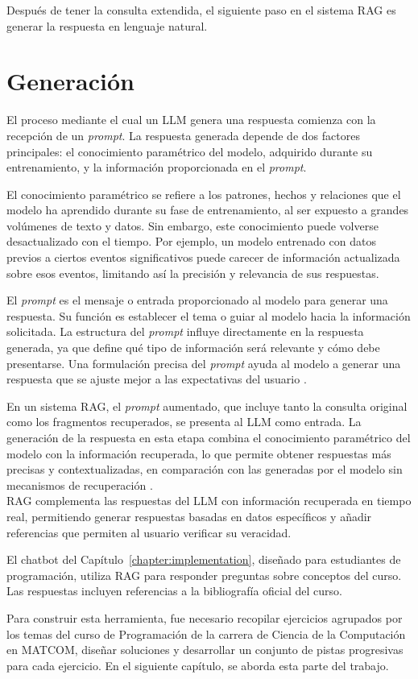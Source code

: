 Después de tener la consulta extendida, el siguiente paso en el sistema RAG es generar la respuesta en lenguaje natural.

\section{Generación}

El proceso mediante el cual un LLM genera una respuesta comienza con la recepción de un \textit{prompt}. La respuesta generada depende de dos factores principales: el conocimiento paramétrico del modelo, adquirido durante su entrenamiento, y la información proporcionada en el \textit{prompt}.

El conocimiento paramétrico se refiere a los patrones, hechos y relaciones que el modelo ha aprendido durante su fase de entrenamiento, al ser expuesto a grandes volúmenes de texto y datos. Sin embargo, este conocimiento puede volverse desactualizado con el tiempo. Por ejemplo, un modelo entrenado con datos previos a ciertos eventos significativos puede carecer de información actualizada sobre esos eventos, limitando así la precisión y relevancia de sus respuestas.

El \textit{prompt} es el mensaje o entrada proporcionado al modelo para generar una respuesta. Su función es establecer el tema o guiar al modelo hacia la información solicitada. La estructura del \textit{prompt} influye directamente en la respuesta generada, ya que define qué tipo de información será relevante y cómo debe presentarse. Una formulación precisa del \textit{prompt} ayuda al modelo a generar una respuesta que se ajuste mejor a las expectativas del usuario \cite{sahoo2024systematicsurveypromptengineering}.

En un sistema RAG, el \textit{prompt} aumentado, que incluye tanto la consulta original como los fragmentos recuperados, se presenta al LLM como entrada. La generación de la respuesta en esta etapa combina el conocimiento paramétrico del modelo con la información recuperada, lo que permite obtener respuestas más precisas y contextualizadas, en comparación con las generadas por el modelo sin mecanismos de recuperación \cite{gao2024retrievalaugmentedgenerationlargelanguage}.\\

RAG complementa las respuestas del LLM con información recuperada en tiempo real, permitiendo generar respuestas basadas en datos específicos y añadir referencias que permiten al usuario verificar su veracidad. 

El chatbot del Capítulo~\ref{chapter:implementation}, diseñado para estudiantes de programación, utiliza RAG para responder preguntas sobre conceptos del curso. Las respuestas incluyen referencias a la bibliografía oficial del curso.

Para construir esta herramienta, fue necesario recopilar ejercicios agrupados por los temas del curso de Programación de la carrera de Ciencia de la Computación en \mbox{MATCOM}, diseñar soluciones y desarrollar un conjunto de pistas progresivas para cada ejercicio. En el siguiente capítulo, se aborda esta parte del trabajo.